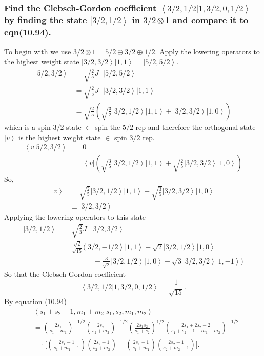 \documentclass[main.tex]{subfiles}
\begin{document}
\subsubsection{Find the Clebsch-Gordon coefficient $\left<3/2,1/2|1,3/2,0,1/2\right>$ by finding the state $\left|3/2,1/2\right>$ in $3/2\otimes1$ and compare it to eqn(10.94).}
To begin with we use $3/2\otimes1=5/2\oplus3/2\oplus1/2$. Apply the lowering operators to the highest weight state $\left|3/2,3/2\right>\left|1,1\right>=\left|5/2,5/2\right>$.
\begin{align}
\left|5/2,3/2\right>&=\sqrt{\frac{2}{5}}J^-\left|5/2,5/2\right>\\
&=\sqrt{\frac{2}{5}}J^-\left|3/2,3/2\right>\left|1,1\right>\\
&=\sqrt{\frac{2}{5}}\left(\sqrt{\frac{3}{2}}\left|3/2,1/2\right>\left|1,1\right>+\left|3/2,3/2\right>\left|1,0\right>\right)
\end{align}
which is a spin $3/2$ state $\in$ spin the $5/2$ rep and therefore the orthogonal state $\left|v\right>$ is the highest weight state $\in$ spin $3/2$ rep.
\begin{align}
\left<v|5/2,3/2\right>=&0\\
=&\left<v\right|\left(\sqrt{\frac{3}{5}}\left|3/2,1/2\right>\left|1,1\right>+\sqrt{\frac{2}{5}}\left|3/2,3/2\right>\left|1,0\right>\right)
\end{align}
So, 
\begin{align}
\left|v\right>&=\sqrt{\frac{2}{5}}\left|3/2,1/2\right>\left|1,1\right>-\sqrt{\frac{3}{5}}\left|3/2,3/2\right>\left|1,0\right>\\
&\equiv\left|3/2,3/2\right>
\end{align}
Applying the lowering operators to this state
\begin{align}
\left|3/2,1/2\right>=&\sqrt{\frac{2}{3}}J^-\left|3/2,3/2\right>\\
=&\frac{\sqrt{2}}{\sqrt{15}}\Big(\left|3/2,-1/2\right>\left|1,1\right>+\sqrt{2}\left|3/2,1/2\right>\left|1,0\right>\nonumber\\
&\qquad\quad-\frac{3}{\sqrt{2}}\left|3/2,1/2\right>\left|1,0\right>-\sqrt{3}\left|3/2,3/2\right>\left|1,-1\right>\Big)
\end{align}
So that the Clebsch-Gordon coefficient 
\begin{equation}
\left<3/2,1/2|1,3/2,0,1/2\right>=\frac{1}{\sqrt{15}}.
\end{equation}
By equation (10.94)
\begin{equation}
\begin{split}
&\left<s_1+s_2-1,m_1+m_2|s_1,s_2,m_1,m_2\right>\\
&=\binom{2s_1}{s_1+m_1}^{-1/2}\binom{2s_2}{s_2+m_2}^{-1/2}\left(\frac{2s_1s_2}{s_1+s_2}\right)^{1/2}\binom{2s_1+2s_2-2}{s_1+s_2-1+m_1+m_2}^{-1/2}\\
&\quad\cdot\Big[\binom{2s_1-1}{s_1+m_1-1}\binom{2s_2-1}{s_2+m_2}-\binom{2s_1-1}{s_1+m_1}\binom{2s_2-1}{s_2+m_2-1}\Big].
\end{split}
\end{equation}
\end{document}
